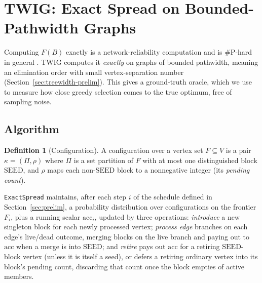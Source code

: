 \documentclass[preprint,11pt]{elsarticle}
\theoremstyle{definition}
\newtheorem{definition}{Definition}
\theoremstyle{remark}
\newcommand{\FF}{F}
\begin{document}
\section{TWIG: Exact Spread on Bounded-Pathwidth Graphs}\label{sec:twig}

Computing $\FF(B)$ exactly is a network-reliability computation and is \#P-hard in general \citep{valiant1979,provan1983}. TWIG computes it \emph{exactly} on graphs of bounded pathwidth, meaning an elimination order with small vertex-separation number (Section~\ref{sec:treewidth-prelim}). This gives a ground-truth oracle, which we use to measure how close greedy selection comes to the true optimum, free of sampling noise.
\subsection{Algorithm}\label{sec:twig-algo}

\begin{definition}[Configuration]\label{def:config}
A configuration over a vertex set $F\subseteq V$ is a pair
$\kappa=(\Pi,\rho)$ where $\Pi$ is a set partition of $F$ with at most one
distinguished block $\mathrm{SEED}$, and $\rho$ maps each non-$\mathrm{SEED}$
block to a nonnegative integer (its \emph{pending count}).
\end{definition}

\texttt{ExactSpread} maintains, after each step $i$ of the schedule defined
in Section~\ref{sec:prelim}, a probability distribution over configurations
on the frontier $F_i$, plus a running scalar $\mathrm{acc}_i$, updated by
three operations: \emph{introduce} a new singleton block for each newly
processed vertex; \emph{process edge} branches on each edge's live/dead
outcome, merging blocks on the live branch and paying out to $\mathrm{acc}$
when a merge is into $\mathrm{SEED}$; and \emph{retire} pays out $\mathrm{acc}$
for a retiring $\mathrm{SEED}$-block vertex (unless it is itself a seed), or
defers a retiring ordinary vertex into its block's pending count, discarding
that count once the block empties of active members.
\end{document}
